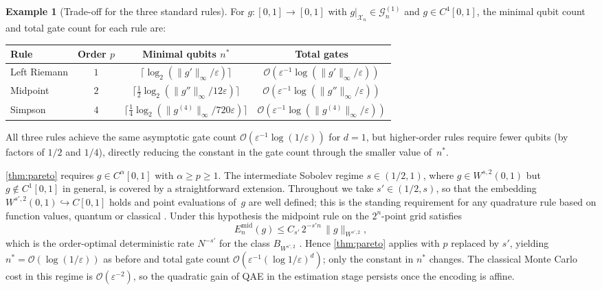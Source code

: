 \documentclass[12pt,a4paper]{article}
\theoremstyle{plain}
\theoremstyle{definition}
\newtheorem{example}[example]{Example}
\theoremstyle{remark}
\newcommand{\Gclass}[2]{\mathcal{G}_{#1}^{(#2)}}
\begin{document}
\begin{example}[Trade-off for the three standard rules]
\label{ex:pareto_rules}
For $g:[0,1]\to[0,1]$ with $g|_{\mathcal{X}_n}\in\Gclass{n}{1}$
and $g\in C^4[0,1]$, the minimal qubit count and total gate count
for each rule are:
\begin{center}
\renewcommand{\arraystretch}{1.6}
\begin{tabular}{lccc}
\toprule
Rule & Order $p$ & Minimal qubits $n^*$ & Total gates \\
\midrule
Left Riemann  & $1$ &
  $\bigl\lceil\log_2(\|g'\|_\infty/\varepsilon)\bigr\rceil$ &
  $\mathcal{O}(\varepsilon^{-1}\log(\|g'\|_\infty/\varepsilon))$ \\[4pt]
Midpoint      & $2$ &
  $\bigl\lceil\tfrac{1}{2}\log_2(\|g''\|_\infty/12\varepsilon)\bigr\rceil$ &
  $\mathcal{O}(\varepsilon^{-1}\log(\|g''\|_\infty/\varepsilon))$ \\[4pt]
Simpson       & $4$ &
  $\bigl\lceil\tfrac{1}{4}\log_2(\|g^{(4)}\|_\infty/720\varepsilon)\bigr\rceil$ &
  $\mathcal{O}(\varepsilon^{-1}\log(\|g^{(4)}\|_\infty/\varepsilon))$ \\
\bottomrule
\end{tabular}
\end{center}
All three rules achieve the same asymptotic gate count
$\mathcal{O}(\varepsilon^{-1}\log(1/\varepsilon))$ for $d=1$, but
higher-order rules require fewer qubits (by factors of $1/2$ and $1/4$),
directly reducing the constant in the gate count through the smaller
value of~$n^*$.
\end{example}

\medskip
\noindent\cref{thm:pareto} requires $g\in C^\alpha[0,1]$ with $\alpha\geq p\geq 1$.
The intermediate Sobolev regime $s\in(1/2,1)$, where $g\in W^{s,2}(0,1)$
but $g\notin C^1[0,1]$ in general, is covered by a straightforward
extension.
Throughout we take $s'\in(1/2,s)$, so that the embedding
$W^{s',2}(0,1)\hookrightarrow C[0,1]$ holds and point evaluations of~$g$
are well defined; this is the standing requirement for
any quadrature rule based on function values, quantum or classical
\cite[Chap.~4]{NovakWozniakowski2008}.
Under this hypothesis the midpoint rule on the $2^n$-point grid
satisfies
\begin{equation}
  E_n^{\mathrm{mid}}(g) \leq C_{s'}\,2^{-s'n}\,\|g\|_{W^{s',2}},
  \label{eq:disc_sobolev_mid}
\end{equation}
which is the order-optimal deterministic rate $N^{-s'}$ for the class
$B_{W^{s',2}}$ \cite{NovakWozniakowski2008}.
Hence \cref{thm:pareto} applies with $p$ replaced by $s'$, yielding
$n^*=\mathcal{O}(\log(1/\varepsilon))$ as before and total gate count
$\mathcal{O}(\varepsilon^{-1}(\log 1/\varepsilon)^d)$; only the
constant in $n^*$ changes.
The classical Monte Carlo cost in this regime is
$\mathcal{O}(\varepsilon^{-2})$, so the quadratic gain of QAE in the
estimation stage persists once the encoding is affine.
\end{document}
